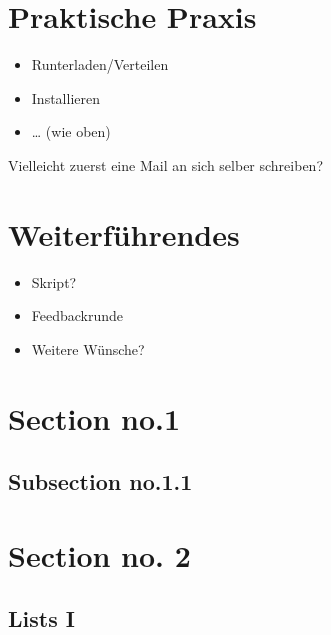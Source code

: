 \documentclass[compress]{beamer}
\begin{document}
\section{Praktische Praxis}
\label{sec:praxis}

\begin{itemize}
\item Runterladen/Verteilen
\item Installieren
\item \ldots{} (wie oben)
\end{itemize}

Vielleicht zuerst eine Mail an sich selber schreiben?

\section{Weiterführendes}
\label{sec-1-1-7}

\begin{itemize}
\item Skript?
\item Feedbackrunde
\item Weitere Wünsche?
\end{itemize}

\section{Section no.1} 
\subsection{Subsection no.1.1  }


\section{Section no. 2} 
\subsection{Lists I}
\end{document}
